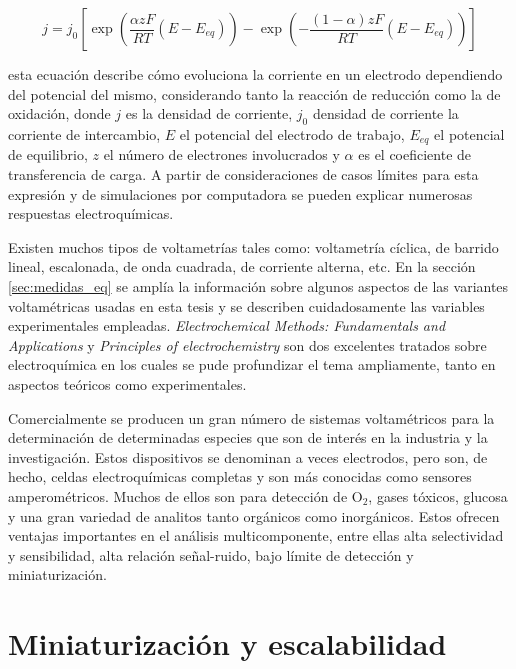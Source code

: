 			\vspace*{3mm}
			\begin{equation}
			j=j_0\left[\exp\left(\frac{\alpha zF}{RT}(E-E_{eq})\right)-\exp\left(-\frac{(1-\alpha)zF}{RT}(E-E_{eq})\right)\right]
			\label{eq:butler}
			\end{equation}
			\vspace*{3mm}

		\noindent esta ecuación describe cómo evoluciona la corriente en un electrodo dependiendo del potencial del mismo, considerando tanto la reacción de reducción como la de oxidación, donde $j$ es la densidad de corriente, $j_0$ densidad de corriente la corriente de intercambio, $E$ el potencial del electrodo de trabajo, $E_{eq}$ el potencial de equilibrio, $z$ el número de electrones involucrados y $\alpha$ es el coeficiente de transferencia de carga. A partir de consideraciones de casos límites para esta expresión y de simulaciones por computadora se pueden explicar numerosas respuestas electroquímicas.

		Existen muchos tipos de voltametrías tales como: voltametría cíclica, de barrido lineal, escalonada, de onda cuadrada, de corriente alterna, etc. En la sección \ref{sec:medidas_eq} se amplía la información sobre algunos aspectos de las variantes voltamétricas usadas en esta tesis y se describen cuidadosamente las variables experimentales empleadas. \textit{Electrochemical Methods: Fundamentals and Applications}\cite{Wi2000} y  \textit{Principles of electrochemistry}\cite{koryta1993} son dos excelentes tratados sobre electroquímica en los cuales se pude profundizar el tema ampliamente, tanto en aspectos teóricos como experimentales. 

		Comercialmente se producen un gran número de sistemas voltamétricos para la determinación de determinadas especies que son de interés en la industria y la investigación. Estos dispositivos se denominan a veces electrodos, pero son, de hecho, celdas electroquímicas completas y son más conocidas como sensores amperométricos. Muchos de ellos son para detección de O$_2$, gases tóxicos, glucosa y una gran variedad de analitos tanto orgánicos como inorgánicos. Estos ofrecen ventajas importantes en el análisis multicomponente, entre ellas alta selectividad y sensibilidad, alta relación señal-ruido, bajo límite de detección y miniaturización.\cite{bakker2006,stradiotto2003,harris2013,Ciosek2007,Kojima2003}
			
\section{Miniaturización y escalabilidad}\label{sec:microfabricacion}\label{sec:intro_fotolito}
		
